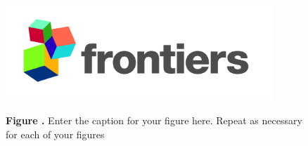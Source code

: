 \documentclass{frontiersSCNS} %
\begin{document}
\begin{figure}[h!]
\begin{center}
\includegraphics[width=10cm]{logo1}%
\end{center}
 \textbf{\label{fig:01} Figure .}{ Enter the caption for your figure here.  Repeat as  necessary for each of your figures }
\end{figure}




\end{document}
